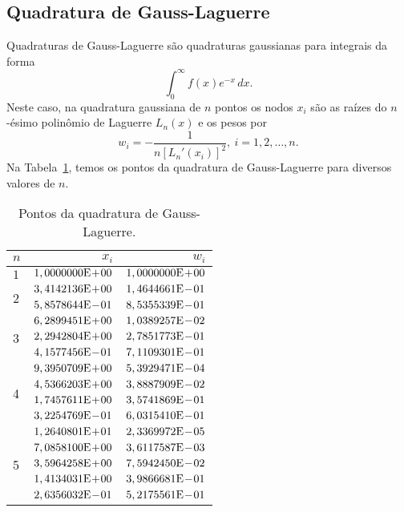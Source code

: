 \subsection{Quadratura de Gauss-Laguerre}

Quadraturas de Gauss-Laguerre são quadraturas gaussianas para integrais da forma
\begin{equation}
  \int_{0}^\infty f(x)e^{-x}\,dx.
\end{equation}
Neste caso, na quadratura gaussiana de $n$ pontos os nodos $x_i$ são as raízes do $n$-ésimo polinômio de Laguerre $L_n(x)$ e os pesos por
\begin{equation}
  w_i = -\frac{1}{n[L_n'(x_i)]^2},~i=1, 2, \dotsc, n.
\end{equation}
Na Tabela~\ref{tab:quad_GLa}, temos os pontos da quadratura de Gauss-Laguerre para diversos valores de $n$.

\begin{table}[h!]
  \centering
  \caption{Pontos da quadratura de Gauss-Laguerre.}
  \begin{tabular}{lrr}
    $n$ & $x_i$ & $w_i$ \\\hline
    $1$ & $1,0000000\mathrm{E}\!+\!00$ & $1,0000000\mathrm{E}\!+\!00$ \\\hline
    \multirow{2}{*}{2}
        & $3,4142136\mathrm{E}\!+\!00$ & $1,4644661\mathrm{E}\!-\!01$ \\
        & $5,8578644\mathrm{E}\!-\!01$ & $8,5355339\mathrm{E}\!-\!01$ \\\hline
    \multirow{3}{*}{3}
        & $6,2899451\mathrm{E}\!+\!00$ & $1,0389257\mathrm{E}\!-\!02$ \\
        & $2,2942804\mathrm{E}\!+\!00$ & $2,7851773\mathrm{E}\!-\!01$ \\
        & $4,1577456\mathrm{E}\!-\!01$ & $7,1109301\mathrm{E}\!-\!01$ \\\hline
    \multirow{4}{*}{4}
        & $9,3950709\mathrm{E}\!+\!00$ & $5,3929471\mathrm{E}\!-\!04$ \\
        & $4,5366203\mathrm{E}\!+\!00$ & $3,8887909\mathrm{E}\!-\!02$ \\
        & $1,7457611\mathrm{E}\!+\!00$ & $3,5741869\mathrm{E}\!-\!01$ \\
        & $3,2254769\mathrm{E}\!-\!01$ & $6,0315410\mathrm{E}\!-\!01$ \\\hline
    \multirow{5}{*}{5}
        & $1,2640801\mathrm{E}\!+\!01$ & $2,3369972\mathrm{E}\!-\!05$ \\
        & $7,0858100\mathrm{E}\!+\!00$ & $3,6117587\mathrm{E}\!-\!03$ \\
        & $3,5964258\mathrm{E}\!+\!00$ & $7,5942450\mathrm{E}\!-\!02$ \\
        & $1,4134031\mathrm{E}\!+\!00$ & $3,9866681\mathrm{E}\!-\!01$ \\
        & $2,6356032\mathrm{E}\!-\!01$ & $5,2175561\mathrm{E}\!-\!01$ \\\hline
  \end{tabular}
  \label{tab:quad_GLa}
\end{table}


